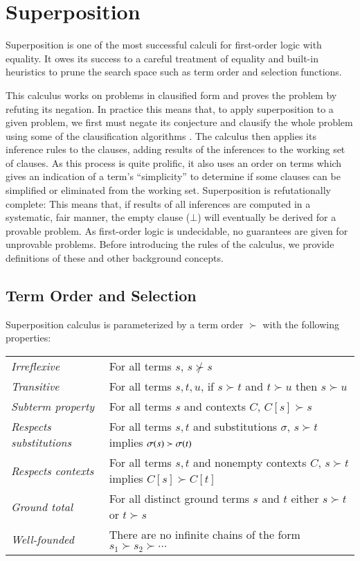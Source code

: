 \section{Superposition}
\label{sec:pre:sup}

Superposition is one of the most successful calculi for first-order logic with
equality. It owes its success to a careful treatment of equality and built-in
heuristics to prune the search space such as term order and selection functions.

This calculus works on problems in clausified form and proves the problem by
refuting its negation. In practice this means that, to apply superposition to a
given problem, we first must negate its conjecture and clausify the whole
problem using some of the clausification algorithms
\cite{nw-01-small-cnf,rsv-16-vcnf}. The calculus then applies its inference
rules to the clauses, adding results of the inferences to the working set of
clauses. As this process is quite prolific, it also uses an order on terms which gives an indication of a
term's ``simplicity'' to determine
if some clauses can be simplified or eliminated from the working set.
Superposition is refutationally complete: This means that, if results of all
inferences are computed in a systematic, fair manner, the empty clause ($\bot$) will
eventually be derived for a provable problem. As first-order logic is
undecidable, no guarantees are given for unprovable problems.
Before introducing the rules of the calculus, we provide definitions of these and other
background concepts.

\subsection{Term Order and Selection}
\label{sec:pre:order}
Superposition calculus is parameterized by a
term order $\succ$ with the following properties:

\noindent\begin{tabular}{p{}p{}}
    \textit{Irreflexive} & For all terms $s$, $s \not\succ s$ \\
    \textit{Transitive} & For all terms $s, t, u$,  if $s\succ t$ and $t \succ u$ then $s \succ u$ \\ 
    \textit{Subterm property} & For all terms $s$ and contexts $C$, $C[s] \succ s$ \\
    \textit{Respects substitutions} & For all terms $s, t$ and substitutions $\sigma$, $s \succ t$ implies $\sigma(s) \succ \sigma(t)$ \\
    \textit{Respects contexts} & For all terms $s,t$ and nonempty contexts $C$, $s \succ t$ implies $C[s] \succ C[t]$ \\
    \textit{Ground total} & For all distinct
    ground terms $s$ and $t$ either $s \succ t$ or $t \succ s$ \\
    \textit{Well-founded} & There are no infinite chains of the form $s_1 \succ s_2 \succ \cdots$ 
\end{tabular}

